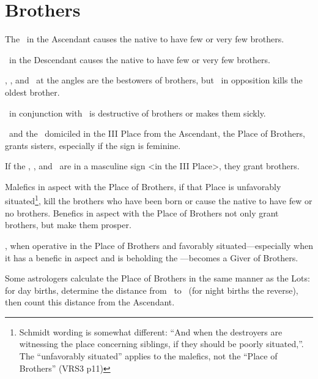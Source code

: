 \section{Brothers}
The \Sun\, in the Ascendant causes the native to have few or very few brothers. 

\Saturn\, in the Descendant causes the native to have few or very few brothers. 

\Jupiter, \Mercury, and \Venus\, at the angles are the bestowers of brothers, but \Saturn\, in opposition kills the oldest brother. 

\Saturn\, in conjunction with \Mars\, is destructive of brothers or makes them sickly. 

\Venus\, and the \Moon\, domiciled in the III Place from the Ascendant, the Place of Brothers, grants sisters, especially if the sign is feminine. 

If the \Sun, \Jupiter, and \Mercury\, are in a masculine sign <in the III Place>, they grant brothers. 

Malefics in aspect with the Place of Brothers, if that Place is unfavorably situated\footnote{Schmidt wording is somewhat different: ``And when the destroyers are witnessing the place concerning siblings, if they should be poorly situated,''. The ``unfavorably situated'' applies to the malefics, not the ``Place of Brothers'' (VRS3 p11)}, kill the brothers who have been born or cause the native to have few or no brothers. Benefics in aspect with the Place of Brothers not only grant brothers, but make them prosper. 

\Mars, when operative in the Place of Brothers and favorably situated—especially when it has a benefic in aspect and is beholding the \Moon—becomes a Giver of Brothers.

Some astrologers calculate the Place of Brothers in the same manner as the Lots: for day births, determine the distance from \Saturn\, to \Jupiter\, (for night births the reverse), then count this distance from the Ascendant.

\newpage
